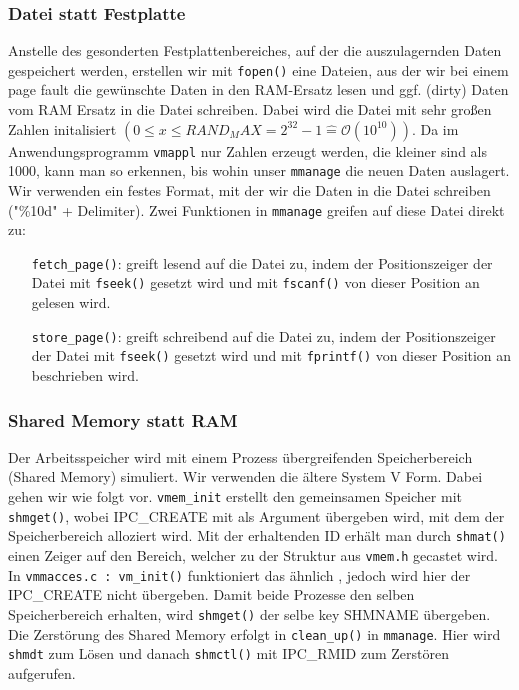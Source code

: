 \documentclass[
   draft=false
  ,paper=a4
  ,twoside=false
  ,fontsize=11pt
  ,headsepline
  ,BCOR10mm
  ,DIV11
  ,parskip=full+
]{scrartcl} %
\begin{document}
        \subsubsection{Datei statt Festplatte}
        Anstelle des gesonderten Festplattenbereiches, auf der die 
        auszulagernden Daten gespeichert werden, erstellen wir mit \texttt{fopen()}
        eine Dateien, aus der wir bei einem page fault die gewünschte Daten 
        in den RAM-Ersatz lesen und ggf. (dirty) Daten vom RAM Ersatz in die 
        Datei schreiben. Dabei wird die Datei mit sehr großen Zahlen initalisiert
        $( 0 \leq x \leq RAND_MAX = 2^{32}-1 \widehat{=} \mathcal{O}(10^{10}))$.
        Da im Anwendungsprogramm \texttt{vmappl} nur Zahlen erzeugt werden, 
        die kleiner sind als 1000, kann man so erkennen, bis wohin unser 
        \texttt{mmanage} die neuen Daten auslagert. Wir verwenden ein festes 
        Format, mit der wir die Daten in die Datei schreiben ("{}\%10d"{} + 
        Delimiter). Zwei Funktionen in \texttt{mmanage} greifen auf diese
        Datei direkt zu: 
        \begin{itemize}
                \item[\texttt{fetch\_page()}:] greift lesend auf die Datei zu,
                indem der Positionszeiger der Datei mit \texttt{fseek()} 
                gesetzt wird und mit \texttt{fscanf()} von dieser Position an 
                gelesen wird.
                \item[\texttt{store\_page()}:] greift schreibend auf die Datei zu,
                indem der Positionszeiger der Datei mit \texttt{fseek()} 
                gesetzt wird und mit \texttt{fprintf()} von dieser Position an
                beschrieben wird.
        \end{itemize}

        \subsubsection{Shared Memory statt RAM}
        Der Arbeitsspeicher wird mit einem Prozess übergreifenden 
        Speicherbereich (Shared Memory) simuliert.
        Wir verwenden die ältere System V Form. Dabei gehen wir wie folgt vor.
        \texttt{vmem\_init} erstellt den gemeinsamen Speicher mit 
        \texttt{shmget()}, wobei IPC\_CREATE mit als Argument übergeben wird,
        mit dem der Speicherbereich alloziert wird. Mit der erhaltenden ID 
        erhält man durch \texttt{shmat()} einen Zeiger auf den Bereich, welcher
        zu der Struktur aus \texttt{vmem.h} gecastet wird. 
        In \texttt{vmmacces.c : vm\_init()} funktioniert das ähnlich , jedoch 
        wird hier der IPC\_CREATE nicht übergeben. Damit beide Prozesse den 
        selben Speicherbereich erhalten, wird \texttt{shmget()} der selbe 
        key SHMNAME übergeben.
        Die Zerstörung des Shared Memory erfolgt in \texttt{clean\_up()} in 
        \texttt{mmanage}. Hier wird \texttt{shmdt} zum Lösen und danach 
        \texttt{shmctl()} mit IPC\_RMID  zum Zerstören aufgerufen.
        
\end{document}
